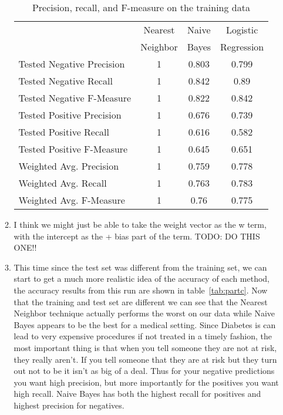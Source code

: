 \documentclass[12pt]{article}
\begin{document}
\begin{enumerate}
\begin{enumerate}
\begin{table}[htdp]
\caption{Precision, recall, and F-measure on the training data}
\begin{center}
\begin{tabular}{l||c|c|c|}
               & Nearest & Naive & Logistic  \\
               & Neighbor &  Bayes & Regression  \\
               \hline
Tested Negative Precision & 1 & 0.803 & 0.799 \\
Tested Negative Recall &1  &  0.842 & 0.89 \\
Tested Negative F-Measure &  1& 0.822 & 0.842 \\
Tested Positive Precision & 1 & 0.676 & 0.739 \\
Tested Positive Recall &1  & 0.616 & 0.582 \\
Tested Positive F-Measure &  1 & 0.645 & 0.651 \\
Weighted Avg. Precision & 1 & 0.759 & 0.778\\
Weighted Avg. Recall & 1 & 0.763 & 0.783 \\
Weighted Avg. F-Measure & 1  & 0.76  &  0.775 \\
\end{tabular}
\end{center}
\label{tab:parta}
\end{table}%


\item %
I think we might just be able to take the weight vector as the w term, with the intercept as the + bias part of the term.
TODO: DO THIS ONE!!


\item %
This time since the test set was different from the training set, we can start to get a much more realistic idea of the accuracy of each method, the accuracy results from this run are shown in table~\ref{tab:partc}. Now that the training and test set are different we can see that the Nearest Neighbor technique actually performs the worst on our data while Naive Bayes appears to be the best for a medical setting. Since Diabetes is can lead to very expensive procedures if not treated in a timely fashion, the most important thing is that when you tell someone they are not at risk, they really aren't. If you tell someone that they are at risk but they turn out not to be it isn't as big of a deal. Thus for your negative predictions you want high precision, but more importantly for the positives you want high recall. Naive Bayes has both the highest recall for positives and highest precision for negatives.


\end{enumerate}
\end{enumerate}
\end{document}
